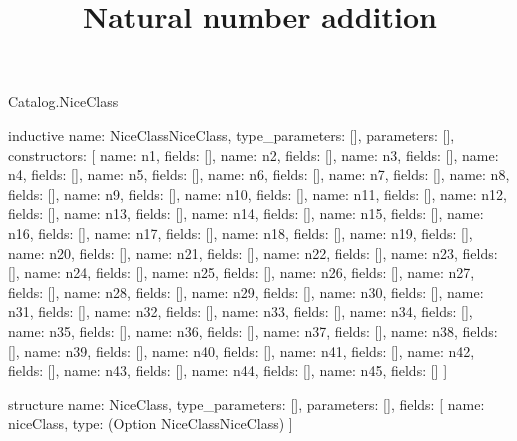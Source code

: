 \begin{lexlean}{Catalog.NiceClass}
\title{Natural number addition}
\begin{semanticmodule}
inductive{
  name: NiceClassNiceClass,
  type_parameters: [],
  parameters: [],
  constructors: [
    {name: n1, fields: []},
    {name: n2, fields: []},
    {name: n3, fields: []},
    {name: n4, fields: []},
    {name: n5, fields: []},
    {name: n6, fields: []},
    {name: n7, fields: []},
    {name: n8, fields: []},
    {name: n9, fields: []},
    {name: n10, fields: []},
    {name: n11, fields: []},
    {name: n12, fields: []},
    {name: n13, fields: []},
    {name: n14, fields: []},
    {name: n15, fields: []},
    {name: n16, fields: []},
    {name: n17, fields: []},
    {name: n18, fields: []},
    {name: n19, fields: []},
    {name: n20, fields: []},
    {name: n21, fields: []},
    {name: n22, fields: []},
    {name: n23, fields: []},
    {name: n24, fields: []},
    {name: n25, fields: []},
    {name: n26, fields: []},
    {name: n27, fields: []},
    {name: n28, fields: []},
    {name: n29, fields: []},
    {name: n30, fields: []},
    {name: n31, fields: []},
    {name: n32, fields: []},
    {name: n33, fields: []},
    {name: n34, fields: []},
    {name: n35, fields: []},
    {name: n36, fields: []},
    {name: n37, fields: []},
    {name: n38, fields: []},
    {name: n39, fields: []},
    {name: n40, fields: []},
    {name: n41, fields: []},
    {name: n42, fields: []},
    {name: n43, fields: []},
    {name: n44, fields: []},
    {name: n45, fields: []}
  ]
}

structure{
  name: NiceClass,
  type_parameters: [],
  parameters: [],
  fields: [
    {name: niceClass, type: (Option NiceClassNiceClass)}
  ]
}
\end{semanticmodule}
\end{lexlean}

